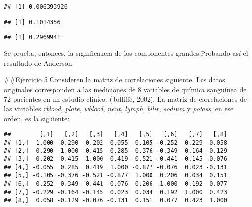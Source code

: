 \documentclass[]{article}
\newenvironment{Shaded}{\begin{snugshade}}{\end{snugshade}}
\newcommand{\DecValTok}[1]{\textcolor[rgb]{0.00,0.00,0.81}{#1}}
\newcommand{\NormalTok}[1]{#1}
\newcommand{\OperatorTok}[1]{\textcolor[rgb]{0.81,0.36,0.00}{\textbf{#1}}}
\begin{document}
\begin{verbatim}
## [1] 0.006393926
\end{verbatim}

\begin{Shaded}
\end{Shaded}

\begin{verbatim}
## [1] 0.1014356
\end{verbatim}

\begin{Shaded}
\end{Shaded}

\begin{verbatim}
## [1] 0.2969941
\end{verbatim}

Se prueba, entonces, la significancia de los componentes
grandes.Probando así el resultado de Anderson.

\#\#Ejercicio 5 Consideren la matriz de correlaciones siguiente. Los
datos originales corresponden a las mediciones de 8 variables de química
sanguínea de 72 pacientes en un estudio clínico. (Jolliffe, 2002). La
matriz de correlaciones de las variables \emph{rblood}, \emph{plate},
\emph{wblood}, \emph{neut}, \emph{lymph}, \emph{bilir}, \emph{sodium} y
\emph{potass}, en ese orden, es la siguiente:

\begin{verbatim}
##        [,1]   [,2]   [,3]   [,4]   [,5]   [,6]   [,7]   [,8]
## [1,]  1.000  0.290  0.202 -0.055 -0.105 -0.252 -0.229  0.058
## [2,]  0.290  1.000  0.415  0.285 -0.376 -0.349 -0.164 -0.129
## [3,]  0.202  0.415  1.000  0.419 -0.521 -0.441 -0.145 -0.076
## [4,] -0.055  0.285  0.419  1.000 -0.877 -0.076  0.023 -0.131
## [5,] -0.105 -0.376 -0.521 -0.877  1.000  0.206  0.034  0.151
## [6,] -0.252 -0.349 -0.441 -0.076  0.206  1.000  0.192  0.077
## [7,] -0.229 -0.164 -0.145  0.023  0.034  0.192  1.000  0.423
## [8,]  0.058 -0.129 -0.076 -0.131  0.151  0.077  0.423  1.000
\end{verbatim}
\end{document}
